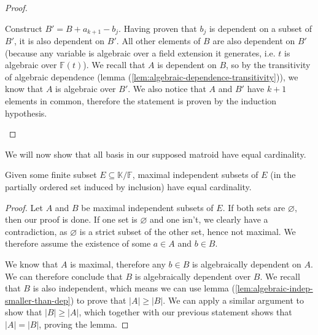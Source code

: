 \begin{proof}
\begin{enumerate}
		      Construct $B' = B + a _{k + 1} - b_j$. Having proven that $b_j$ is dependent on a subset of $B'$, it is also dependent on $B'$. All other elements of $B$ are also dependent on $B'$ (because any variable is algebraic over a field extension it generates, i.e. $t$ is algebraic over $\mathbb F(t)$). We recall that $A$ is dependent on $B$, so by the transitivity of algebraic dependence (lemma (\ref{lem:algebraic-dependence-transitivity})), we know that $A$ is algebraic over $B'$. We also notice that $A$ and $B'$ have $k + 1$ elements in common, therefore the statement is proven by the induction hypothesis.
	\end{enumerate}
\end{proof}

We will now show that all basis in our supposed matroid have equal cardinality.

\begin{lemma}
	Given some finite subset $E \subseteq \mathbb K / \mathbb F$, maximal independent subsets of $E$ (in the partially ordered set induced by inclusion) have equal cardinality.
\end{lemma}

\begin{proof}
	Let $A$ and $B$ be maximal independent subsets of $E$. If both sets are $\varnothing$, then our proof is done. If one set is $\varnothing$ and one isn't, we clearly have a contradiction, as $\varnothing$ is a strict subset of the other set, hence not maximal. We therefore assume the existence of some $a \in A$ and $b \in B$.

	We know that $A$ is maximal, therefore any $b \in B$ is algebraically dependent on $A$. We can therefore conclude that $B$ is algebraically dependent over $B$. We recall that $B$ is also independent, which means we can use lemma (\ref{lem:algebraic-indep-smaller-than-dep}) to prove that $|A| \geq |B|$. We can apply a similar argument to show that $|B| \geq |A|$, which together with our previous statement shows that $|A| = |B|$, proving the lemma.
\end{proof}

